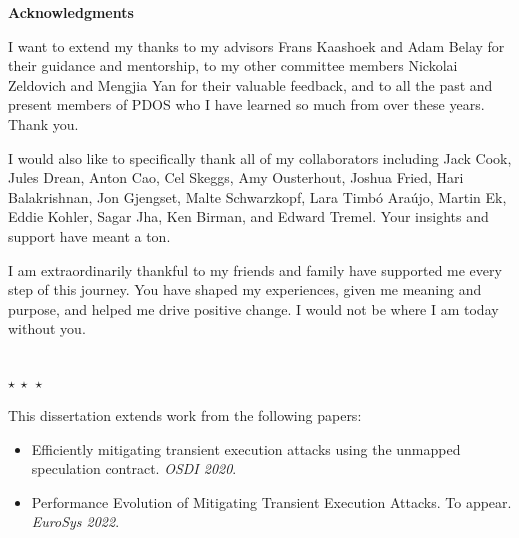 
{\noindent \huge \bf Acknowledgments\\}

I want to extend my thanks to my advisors Frans Kaashoek and Adam Belay
for their guidance and mentorship, to my other committee members Nickolai Zeldovich and Mengjia Yan for their valuable feedback, and to all the past and present members of PDOS who I have learned so much from over these years.
Thank you.

I would also like to specifically thank all of my collaborators including Jack Cook, Jules Drean, Anton Cao, Cel Skeggs, Amy Ousterhout, Joshua Fried, Hari Balakrishnan, Jon Gjengset, Malte Schwarzkopf, Lara Timbó Araújo, Martin Ek, Eddie Kohler, Sagar Jha, Ken Birman, and Edward Tremel. Your insights and support have meant a ton.

I am extraordinarily thankful to my friends and family have supported me every step of this journey.
You have shaped my experiences, given me meaning and purpose, and helped me drive positive change.
I would not be where I am today without you.

\begin{center}
    ~\\[\baselineskip]
    $\star~\star~\star$
    ~\\[\baselineskip]
\end{center}


\noindent
This dissertation extends work from the following papers:
\begin{itemize}
\item Efficiently mitigating transient execution attacks using the unmapped speculation contract. \textit{OSDI 2020}.
\item Performance Evolution of Mitigating Transient Execution Attacks. To appear. \textit{\mbox{EuroSys} 2022}.
\end{itemize}
